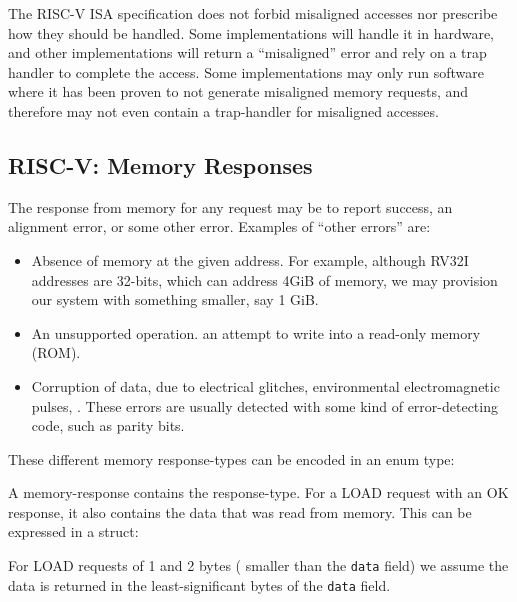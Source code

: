 The RISC-V ISA specification does not forbid misaligned accesses nor
prescribe how they should be handled.  Some implementations will
handle it in hardware, and other implementations will return a
``misaligned'' error and rely on a trap handler to complete the
access.  Some implementations may only run software where it has been
proven to not generate misaligned memory requests, and therefore may
not even contain a trap-handler for misaligned accesses.


\subsection{RISC-V: Memory Responses}

\label{Sec_Mem_Rsp}


The response from memory for any request may be to report success, an
alignment error, or some other error.  Examples of ``other errors''
are:

\begin{itemize}

\item Absence of memory at the given address.  For example, although
  RV32I addresses are 32-bits, which can address 4GiB of memory, we
  may provision our system with something smaller, say 1 GiB.

\item An unsupported operation. {\Eg} an attempt to write into a
  read-only memory (ROM).

\item Corruption of data, due to electrical glitches, environmental
  electromagnetic pulses, {\etc}.  These errors are usually detected
  with some kind of error-detecting code, such as parity bits.

\end{itemize}

These different memory response-types can be encoded in an enum type:



A memory-response contains the response-type. For a LOAD request with
an OK response, it also contains the data that was read from memory.
This can be expressed in a struct:



For LOAD requests of 1 and 2 bytes ({\ie} smaller than the \verb|data|
field) we assume the data is returned in the least-significant bytes
of the \verb|data| field.

